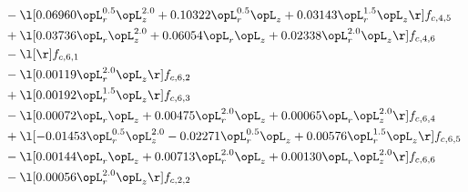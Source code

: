 \begin{alignat}{2}
& - \l[  0.06960 \opL_r^{0.5} \opL_z^{2.0} +  0.10322 \opL_r^{0.5} \opL_z +  0.03143 \opL_r^{1.5} \opL_z  \r] f_{c,4,5} \nonumber \\ 
& + \l[  0.03736 \opL_r \opL_z^{2.0} +  0.06054 \opL_r \opL_z +  0.02338 \opL_r^{2.0} \opL_z  \r] f_{c,4,6} \nonumber \\ 
& - \l[  \r] f_{c,6,1} \nonumber \\ 
& - \l[  0.00119 \opL_r^{2.0} \opL_z  \r] f_{c,6,2} \nonumber \\ 
& + \l[  0.00192 \opL_r^{1.5} \opL_z  \r] f_{c,6,3} \nonumber \\ 
& - \l[  0.00072 \opL_r \opL_z +  0.00475 \opL_r^{2.0} \opL_z +  0.00065 \opL_r \opL_z^{2.0}  \r] f_{c,6,4} \nonumber \\ 
& + \l[  -0.01453 \opL_r^{0.5} \opL_z^{2.0}   -0.02271 \opL_r^{0.5} \opL_z +  0.00576 \opL_r^{1.5} \opL_z  \r] f_{c,6,5} \nonumber \\ 
& - \l[  0.00144 \opL_r \opL_z +  0.00713 \opL_r^{2.0} \opL_z +  0.00130 \opL_r \opL_z^{2.0}  \r] f_{c,6,6} \nonumber \\ 
& - \l[  0.00056 \opL_r^{2.0} \opL_z  \r] f_{c,2,2} \nonumber \\ 
\end{alignat} 


